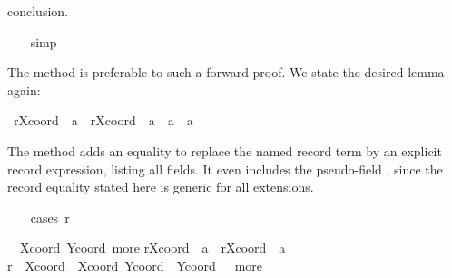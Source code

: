 \begin{isabellebody}
\begin{isamarkuptxt}
    conclusion.%
\end{isamarkuptxt}%
\isamarkuptrue%
\ \ \isamarkupfalse%
\ simp\isanewline
\ \ \isamarkupfalse%
%
\endisatagproof
{\isafoldproof}%
%
\isadelimproof
%
\endisadelimproof
%
\begin{isamarkuptext}%
The  method is preferable to such a forward proof.  We
  state the desired lemma again:%
\end{isamarkuptext}%
\isamarkuptrue%
\isamarkupfalse%
\ {}r{}Xcoord\ {}{}\ a{}\ {}\ r{}Xcoord\ {}{}\ a{}{}\ {}\ a\ {}\ a{}{}%
\isadelimproof
%
\endisadelimproof
%
\isatagproof
%
\begin{isamarkuptxt}%
The  method adds an equality to replace the
  named record term by an explicit record expression, listing all
  fields.  It even includes the pseudo-field , since the
  record equality stated here is generic for all extensions.%
\end{isamarkuptxt}%
\isamarkuptrue%
\ \ \isamarkupfalse%
\ {}cases\ r{}%
\begin{isamarkuptxt}%
\begin{isabelle}%
\ {}{}\ {}Xcoord\ Ycoord\ more{}\isanewline
{}r{}Xcoord\ {}{}\ a{}\ {}\ r{}Xcoord\ {}{}\ a{}{}{}\isanewline
{}r\ {}\ {}Xcoord\ {}\ Xcoord{}\ Ycoord\ {}\ Ycoord{}\ {}\ {}\ more{}{}\isanewline

\end{isabelle}
\end{isamarkuptxt}
\end{isabellebody}
